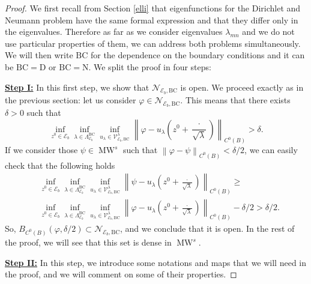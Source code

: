 \documentclass{amsart}
\theoremstyle{definition}
\theoremstyle{remark}
\renewcommand\geq\geqslant
\numberwithin{equation}{section}
\theoremstyle{definition}
\theoremstyle{remark}
\DeclareMathOperator\MW{MW}
\begin{document}
\begin{proof}	
	
	We first recall from Section \ref{elli} that eigenfunctions for the Dirichlet and Neumann problem have the same formal expression and that they differ only in the eigenvalues. Therefore as far as we consider eigenvalues $\lambda_{mn}$ and we do not use particular properties of them, we can address both problems simultaneously. We will then write $\mathrm{BC}$ for the dependence on the boundary conditions and it can be $\mathrm{BC}=\mathrm{D}$ or $\mathrm{BC}=\mathrm{N}$. We split the proof in four steps: 
     
	\textbf{	\underline{Step I:}} In this first step, we show that $\mathcal{N}_{\mathcal{E}_b,\mathrm{BC}}$ is open. We proceed exactly as in the  previous section: let us consider $\varphi\in\mathcal{N}_{\mathcal{E}_b,\mathrm{BC}}$. This means that there exists $\delta>0$ such that \begin{equation}	\inf_{ z^0\in\mathcal{E}_b}\inf_{\lambda\in\Lambda_{\mathcal{E}_b}^{\mathrm{BC}}}\inf_{u_\lambda \in\mathcal{V}_{\mathcal{E}_b,\mathrm{BC}}^\lambda}\left\|\varphi-u_\lambda\left(z^0+\frac{\cdot}{\sqrt{\lambda}}\right)\right\|_{C^0\left(B\right)}>\delta.\end{equation}If we consider those $\psi\in\MW^s$ such that $\left\|\varphi-\psi\right\|_{C^0\left(B\right)}<\delta/2$, we can easily check that the following holds \begin{equation}\begin{aligned}	&\inf_{ z^0\in\mathcal{E}_b}\inf_{\lambda\in\Lambda_{\mathcal{E}_b}^{\mathrm{BC}}}\inf_{u_\lambda \in\mathcal{V}_{\mathcal{E}_b,\mathrm{BC}}^\lambda}\left\|\psi-u_\lambda\left(z^0+\frac{\cdot}{\sqrt{\lambda}}\right)\right\|_{C^0\left(B\right)}\geq\\&	\inf_{ z^0\in\mathcal{E}_b}\inf_{\lambda\in\Lambda_{\mathcal{E}_b}^{\mathrm{BC}}}\inf_{u_\lambda \in\mathcal{V}_{\mathcal{E}_b,\mathrm{BC}}^\lambda}\left\|\varphi-u_\lambda\left(z^0+\frac{\cdot}{\sqrt{\lambda}}\right)\right\|_{C^0\left(B\right)}-\delta/2>\delta/2.\end{aligned}\end{equation}So, $B_{C^0\left(B\right)}\left(\varphi,\delta/2\right)\subset\mathcal{N}_{\mathcal{E}_b,\mathrm{BC}}$, and we conclude that it is open. In the rest of the proof, we will see that this set is dense in $\MW^s$. 

      \textbf{	\underline{Step II:}} In this step, we introduce some notations and maps that we will need in the proof, and we will comment on some of their properties.
      

\end{proof}
\end{document}
